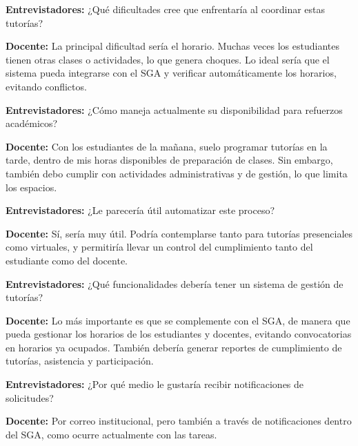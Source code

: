 \noindent\textbf{Entrevistadores:} ¿Qué dificultades cree que enfrentaría al coordinar estas tutorías?\par\smallskip

\noindent\textbf{Docente:} La principal dificultad sería el horario. Muchas veces los estudiantes tienen otras clases o actividades, lo que genera choques. Lo ideal sería que el sistema pueda integrarse con el SGA y verificar automáticamente los horarios, evitando conflictos.\par\smallskip

\noindent\textbf{Entrevistadores:} ¿Cómo maneja actualmente su disponibilidad para refuerzos académicos?\par\smallskip

\noindent\textbf{Docente:} Con los estudiantes de la mañana, suelo programar tutorías en la tarde, dentro de mis horas disponibles de preparación de clases. Sin embargo, también debo cumplir con actividades administrativas y de gestión, lo que limita los espacios.\par\smallskip

\noindent\textbf{Entrevistadores:} ¿Le parecería útil automatizar este proceso?\par\smallskip

\noindent\textbf{Docente:} Sí, sería muy útil. Podría contemplarse tanto para tutorías presenciales como virtuales, y permitiría llevar un control del cumplimiento tanto del estudiante como del docente.\par\smallskip

\noindent\textbf{Entrevistadores:} ¿Qué funcionalidades debería tener un sistema de gestión de tutorías?\par\smallskip

\noindent\textbf{Docente:} Lo más importante es que se complemente con el SGA, de manera que pueda gestionar los horarios de los estudiantes y docentes, evitando convocatorias en horarios ya ocupados. También debería generar reportes de cumplimiento de tutorías, asistencia y participación.\par\smallskip

\noindent\textbf{Entrevistadores:} ¿Por qué medio le gustaría recibir notificaciones de solicitudes?\par\smallskip

\noindent\textbf{Docente:} Por correo institucional, pero también a través de notificaciones dentro del SGA, como ocurre actualmente con las tareas.\par\smallskip

